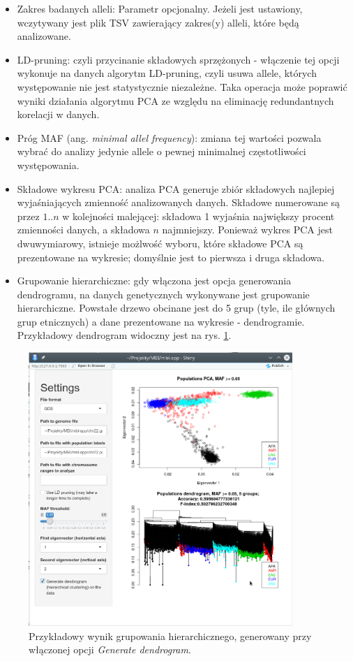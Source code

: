 \documentclass[a4paper]{article}
\begin{document}
\begin{itemize}
\item Zakres badanych alleli: Parametr opcjonalny. Jeżeli jest ustawiony, wczytywany jest plik TSV zawierający zakres(y) alleli, które będą analizowane. 
\item LD-pruning: czyli przycinanie składowych sprzężonych - włączenie tej opcji wykonuje na danych algorytm LD-pruning, czyli usuwa allele, których występowanie nie jest statystycznie niezależne. Taka operacja może poprawić wyniki działania algorytmu PCA ze względu na eliminację redundantnych korelacji w danych. 
\item Próg MAF (ang. \emph{minimal allel frequency}): zmiana tej wartości pozwala wybrać do analizy jedynie allele o pewnej minimalnej częstotliwości występowania. 
\item Składowe wykresu PCA: analiza PCA generuje zbiór składowych najlepiej wyjaśniających zmienność analizowanych danych. Składowe numerowane są przez $1..n$ w kolejności malejącej: składowa 1 wyjaśnia największy procent zmienności danych, a składowa $n$ najmniejszy. Ponieważ wykres PCA jest dwuwymiarowy, istnieje możlwość wyboru, które składowe PCA są prezentowane na wykresie; domyślnie jest to pierwsza i druga składowa. 
\item Grupowanie hierarchiczne: gdy włączona jest opcja generowania dendrogramu, na danych genetycznych wykonywane jest grupowanie hierarchiczne. Powstałe drzewo obcinane jest do 5 grup (tyle, ile głównych grup etnicznych) a dane prezentowane na wykresie - dendrogramie. Przykładowy dendrogram widoczny jest na rys. \ref{fig:dend}. 
\end{itemize}

\begin{figure}
\centering \includegraphics[width=10cm]{example-dend}
\caption{Przykładowy wynik grupowania hierarchicznego, generowany przy włączonej opcji \emph{Generate dendrogram}.} \label{fig:dend}
\end{figure}
\end{document}
